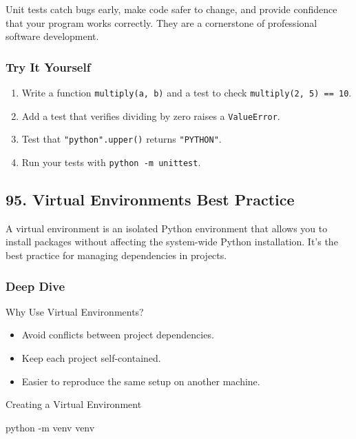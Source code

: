 \documentclass[
  letterpaper,
  DIV=11,
  numbers=noendperiod]{scrreprt}
\newenvironment{Shaded}{\begin{snugshade}}{\end{snugshade}}
\newcommand{\AttributeTok}[1]{\textcolor[rgb]{0.40,0.45,0.13}{#1}}
\newcommand{\ExtensionTok}[1]{\textcolor[rgb]{0.00,0.23,0.31}{#1}}
\newcommand{\NormalTok}[1]{\textcolor[rgb]{0.00,0.23,0.31}{#1}}
\providecommand{\tightlist}{%
  \setlength{\itemsep}{0pt}\setlength{\parskip}{0pt}}
\begin{document}
Unit tests catch bugs early, make code safer to change, and provide
confidence that your program works correctly. They are a cornerstone of
professional software development.

\subsubsection{Try It Yourself}\label{try-it-yourself-93}

\begin{enumerate}
\def\labelenumi{\arabic{enumi}.}
\tightlist
\item
  Write a function \texttt{multiply(a,\ b)} and a test to check
  \texttt{multiply(2,\ 5)\ ==\ 10}.
\item
  Add a test that verifies dividing by zero raises a
  \texttt{ValueError}.
\item
  Test that \texttt{"python".upper()} returns \texttt{"PYTHON"}.
\item
  Run your tests with \texttt{python\ -m\ unittest}.
\end{enumerate}

\subsection{95. Virtual Environments Best
Practice}\label{virtual-environments-best-practice}

A virtual environment is an isolated Python environment that allows you
to install packages without affecting the system-wide Python
installation. It's the best practice for managing dependencies in
projects.

\subsubsection{Deep Dive}\label{deep-dive-94}

Why Use Virtual Environments?

\begin{itemize}
\tightlist
\item
  Avoid conflicts between project dependencies.
\item
  Keep each project self-contained.
\item
  Easier to reproduce the same setup on another machine.
\end{itemize}

Creating a Virtual Environment

\begin{Shaded}
\begin{Highlighting}[]
\ExtensionTok{python} \AttributeTok{{-}m}\NormalTok{ venv venv}
\end{Highlighting}
\end{Shaded}
\end{document}

